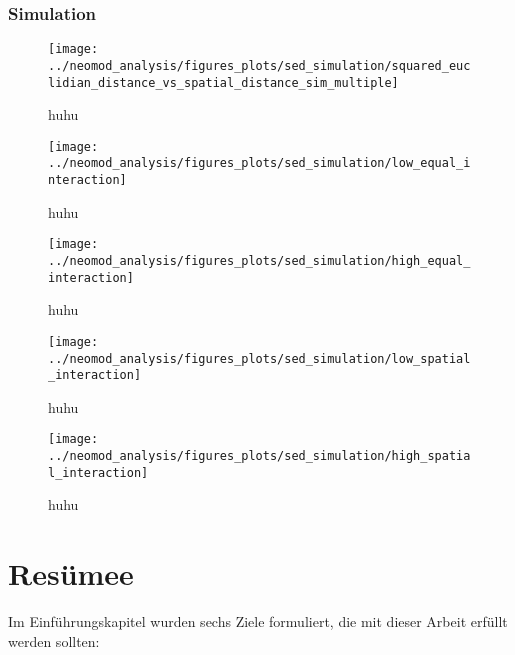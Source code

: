 \documentclass[openany,twoside,twocolumn]{book}
\let\pby\printbibliography
\renewcommand{\printbibliography}{}
\begin{document}
\hypertarget{simulation-1}{%
\subsection{Simulation}\label{simulation-1}}

\begin{landscape}
\begin{figure}
\texttt{[image: ../neomod\_analysis/figures\_plots/sed\_simulation/squared\_euclidian\_distance\_vs\_spatial\_distance\_sim\_multiple]} \caption[huhu]{huhu}\label{fig:sim-sed}
\end{figure}
\end{landscape}

\begin{figure}
\texttt{[image: ../neomod\_analysis/figures\_plots/sed\_simulation/low\_equal\_interaction]} \caption[huhu]{huhu}\label{fig:sim-spearman-low-equal}
\end{figure}

\begin{figure}
\texttt{[image: ../neomod\_analysis/figures\_plots/sed\_simulation/high\_equal\_interaction]} \caption[huhu]{huhu}\label{fig:sim-spearman-high-equal}
\end{figure}

\begin{figure}
\texttt{[image: ../neomod\_analysis/figures\_plots/sed\_simulation/low\_spatial\_interaction]} \caption[huhu]{huhu}\label{fig:sim-spearman-low-spatial}
\end{figure}

\begin{figure}
\texttt{[image: ../neomod\_analysis/figures\_plots/sed\_simulation/high\_spatial\_interaction]} \caption[huhu]{huhu}\label{fig:sim-spearman-high-spatial}
\end{figure}

\newpage
\pby[title={Literatur},segment=\therefsegment,heading=subbibintoc]

\hypertarget{resumee}{%
\chapter{Resümee}\label{resumee}}

Im Einführungskapitel wurden sechs Ziele formuliert, die mit dieser
Arbeit erfüllt werden sollten:
\end{document}
